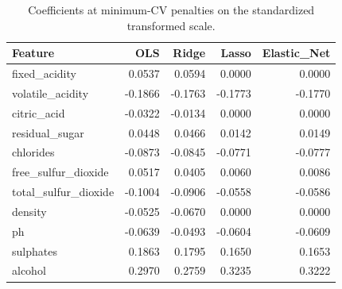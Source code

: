 \begin{table}

\caption{\label{tab:p4-coefficient-comparison}Coefficients at minimum-CV penalties on the standardized transformed scale.}
\centering
\begin{tabular}[t]{lrrrr}
\toprule
Feature & OLS & Ridge & Lasso & Elastic\_Net\\
\midrule
fixed\_acidity & 0.0537 & 0.0594 & 0.0000 & 0.0000\\
volatile\_acidity & -0.1866 & -0.1763 & -0.1773 & -0.1770\\
citric\_acid & -0.0322 & -0.0134 & 0.0000 & 0.0000\\
residual\_sugar & 0.0448 & 0.0466 & 0.0142 & 0.0149\\
chlorides & -0.0873 & -0.0845 & -0.0771 & -0.0777\\
\addlinespace
free\_sulfur\_dioxide & 0.0517 & 0.0405 & 0.0060 & 0.0086\\
total\_sulfur\_dioxide & -0.1004 & -0.0906 & -0.0558 & -0.0586\\
density & -0.0525 & -0.0670 & 0.0000 & 0.0000\\
ph & -0.0639 & -0.0493 & -0.0604 & -0.0609\\
sulphates & 0.1863 & 0.1795 & 0.1650 & 0.1653\\
\addlinespace
alcohol & 0.2970 & 0.2759 & 0.3235 & 0.3222\\
\bottomrule
\end{tabular}
\end{table}
